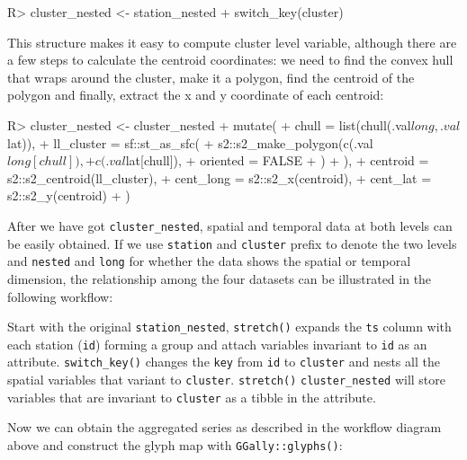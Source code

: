 \documentclass[
]{jss}
\begin{document}
\begin{CodeChunk}
\begin{CodeInput}
R> cluster_nested <- station_nested %
+   switch_key(cluster)
\end{CodeInput}
\end{CodeChunk}

This structure makes it easy to compute cluster level variable, although
there are a few steps to calculate the centroid coordinates: we need to
find the convex hull that wraps around the cluster, make it a polygon,
find the centroid of the polygon and finally, extract the x and y
coordinate of each centroid:

\begin{CodeChunk}
\begin{CodeInput}
R> cluster_nested <- cluster_nested %
+   mutate(
+     chull = list(chull(.val$long, .val$lat)),
+     ll_cluster = sf::st_as_sfc(
+       s2::s2_make_polygon(c(.val$long[chull]),
+         c(.val$lat[chull]),
+         oriented = FALSE
+       )
+     ),
+     centroid = s2::s2_centroid(ll_cluster),
+     cent_long = s2::s2_x(centroid),
+     cent_lat = s2::s2_y(centroid)
+   )
\end{CodeInput}
\end{CodeChunk}

After we have got \texttt{cluster\_nested}, spatial and temporal data at
both levels can be easily obtained. If we use \texttt{station} and
\texttt{cluster} prefix to denote the two levels and \texttt{nested} and
\texttt{long} for whether the data shows the spatial or temporal
dimension, the relationship among the four datasets can be illustrated
in the following workflow:

Start with the original \texttt{station\_nested}, \texttt{stretch()}
expands the \texttt{ts} column with each station (\texttt{id}) forming a
group and attach variables invariant to \texttt{id} as an attribute.
\texttt{switch\_key()} changes the \texttt{key} from \texttt{id} to
\texttt{cluster} and nests all the spatial variables that variant to
\texttt{cluster}. \texttt{stretch()} \texttt{cluster\_nested} will store
variables that are invariant to \texttt{cluster} as a tibble in the
attribute.

Now we can obtain the aggregated series as described in the workflow
diagram above and construct the glyph map with
\texttt{GGally::glyphs()}:
\end{document}
